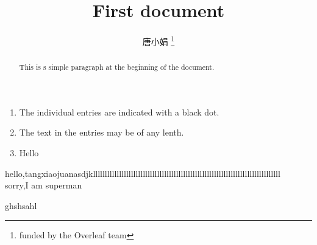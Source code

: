 \documentclass[12pt,letterpaper]{article}
\title{First document}
\author{唐小娟 \thanks{funded by the Overleaf team}}
\begin{document}

\begin{abstract}
    This is s simple paragraph at the beginning of the document.
\end{abstract}

\begin{enumerate}
    \item The individual entries are indicated with a black dot.
    \item The text in the entries may be of any lenth.
    \item Hello
\end{enumerate}
hello,tangxiaojuanasdjklllllllllllllllllllllllllllllllllllllllllllllllllllllllllllllllllllllllllllllll
\\sorry,I am superman   %

ghshsahl
\end{document}
